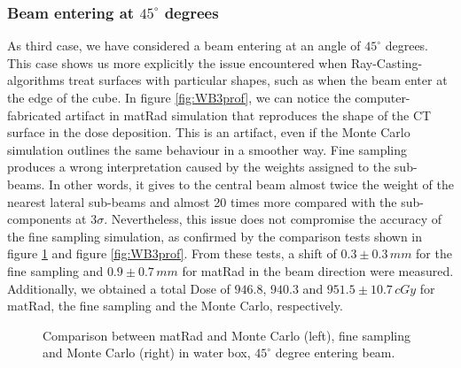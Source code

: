 \documentclass[12pt, a4paper, twoside]{book}
\begin{document}

\subsubsection{Beam entering at $45^\circ$ degrees}
As third case, we have considered a beam entering at an angle of $45^\circ$ degrees. This case shows us more explicitly the issue encountered when Ray-Casting-algorithms treat surfaces with particular shapes, such as when the beam enter at the edge of the cube. In figure \ref{fig:WB3prof}, we can notice the computer-fabricated artifact in matRad simulation that reproduces the shape of the CT surface in the dose deposition. This is an artifact, even if the Monte Carlo simulation outlines the same behaviour in a smoother way. Fine sampling produces a wrong interpretation caused by the weights assigned to the sub-beams. In other words, it gives to the central beam almost twice the weight of the nearest lateral sub-beams and almost 20 times more compared with the sub-components at $3\sigma$.
Nevertheless, this issue does not compromise the accuracy of the fine sampling simulation, as confirmed by the comparison tests shown in figure \ref{fig:WB3gam} and figure \ref{fig:WB3prof}. From these tests, a shift of $0.3\pm0.3\,mm$ for the fine sampling and $0.9\pm0.7\,mm$ for matRad in the beam direction were measured. Additionally, we obtained a total Dose of $946.8$, $940.3$ and $951.5\pm10.7\,cGy$ for matRad, the fine sampling and the Monte Carlo, respectively.

\begin{figure}[!ht]
\centering
{} 
\caption{Comparison between matRad and Monte Carlo (left), fine sampling and Monte Carlo (right) in water box,  $45^\circ$ degree entering beam.}
\label{fig:WB3gam}
\end{figure}
\end{document}
